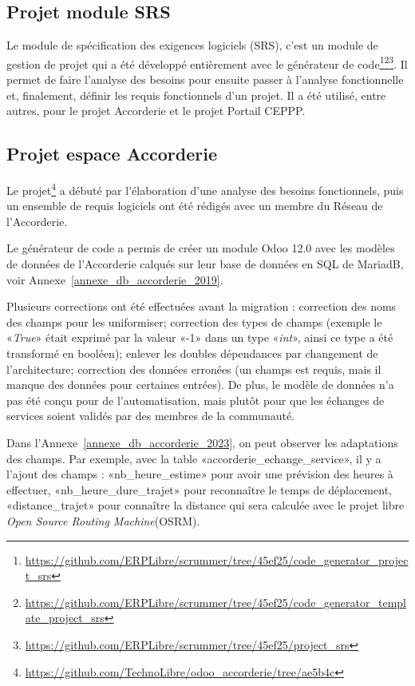 \subsection{Projet module SRS}

Le module de spécification des exigences logiciels (SRS), c’est un module de gestion de projet qui a été développé entièrement avec le générateur de code\footnote{\url{https://github.com/ERPLibre/scrummer/tree/45ef25/code_generator_project_srs}}\footnote{\url{https://github.com/ERPLibre/scrummer/tree/45ef25/code_generator_template_project_srs}}\footnote{\url{https://github.com/ERPLibre/scrummer/tree/45ef25/project_srs}}. Il permet de faire l’analyse des besoins pour ensuite passer à l’analyse fonctionnelle et, finalement, définir les requis fonctionnels d’un projet. Il a été utilisé, entre autres, pour le projet Accorderie et le projet Portail CEPPP.

\subsection{Projet espace Accorderie}

Le projet\footnote{\url{https://github.com/TechnoLibre/odoo_accorderie/tree/ae5b4c}} a débuté par l'élaboration d'une analyse des besoins fonctionnels, puis un ensemble de requis logiciels ont été rédigés avec un membre du Réseau de l'Accorderie. %

Le générateur de code a permis de créer un module Odoo 12.0 avec les modèles de données de l'Accorderie calqués sur leur base de données en SQL de MariadB, voir Annexe~\ref{annexe_db_accorderie_2019}.

Plusieurs corrections ont été effectuées avant la migration : correction des noms des champs pour les uniformiser; correction des types de champs (exemple le «\textit{True}» était exprimé par la valeur «-1» dans un type «\textit{int}», ainsi ce type a été transformé en booléen); enlever les doubles dépendances par changement de l’architecture; correction des données erronées (un champs est requis, mais il manque des données pour certaines entrées). De plus, le modèle de données n’a pas été conçu pour de l’automatisation, mais plutôt pour que les échanges de services soient validés par des membres de la communauté.

Dans l'Annexe~\ref{annexe_db_accorderie_2023}, on peut observer les adaptations des champs. Par exemple, avec la table «accorderie\_echange\_service», il y a l'ajout des champs : «nb\_heure\_estime» pour avoir une prévision des heures à effectuer, «nb\_heure\_dure\_trajet» pour reconnaître le temps de déplacement, «distance\_trajet» pour connaître la distance qui sera calculée avec le projet libre \textit{Open Source Routing Machine}(OSRM).

